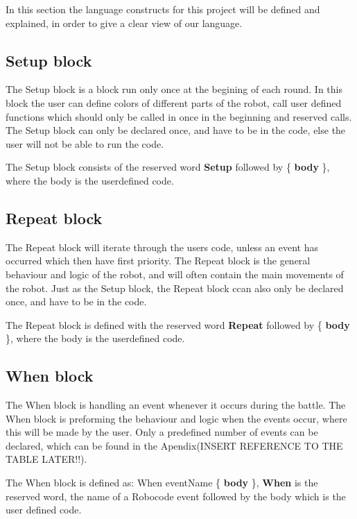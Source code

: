 In this section the language constructs for this project will be defined and explained, in order to give a clear view of our language.

\subsection{Setup block}
The Setup block is a block run only once at the begining of each round. In this block the user can define colors of different parts of the robot, call user defined functions which should only be called in once in the beginning and reserved calls. The Setup block can only be declared once, and have to be in the code, else the user will not be able to run the code.

\begin{defi}
The Setup block consists of the reserved word \textbf{Setup} followed by \{ \textbf{body} \}, where the body is the userdefined code. 
\end{defi}

\subsection{Repeat block}
The Repeat block will iterate through the users code, unless an event has occurred which then have first priority. The Repeat block is the general behaviour and logic of the robot, and will often contain the main movements of the robot. Just as the Setup block, the Repeat block ccan also only be declared once, and have to be in the code.

\begin{defi}
The Repeat block is defined with the reserved word \textbf{Repeat} followed by \{ \textbf{body} \}, where the body is the userdefined code.
\end{defi}

\subsection{When block}
The When block is handling an event whenever it occurs during the battle. The When block is preforming the behaviour and logic when the events occur, where this will be made by the user. Only a predefined number of events can be declared, which can be found in the Apendix(INSERT REFERENCE TO THE TABLE LATER!!).

\begin{defi}
The When block is defined as: When eventName \{ \textbf{body} \}, \textbf{When} is the reserved word, the name of a Robocode event followed by the body which is the user defined code.
\end{defi}

